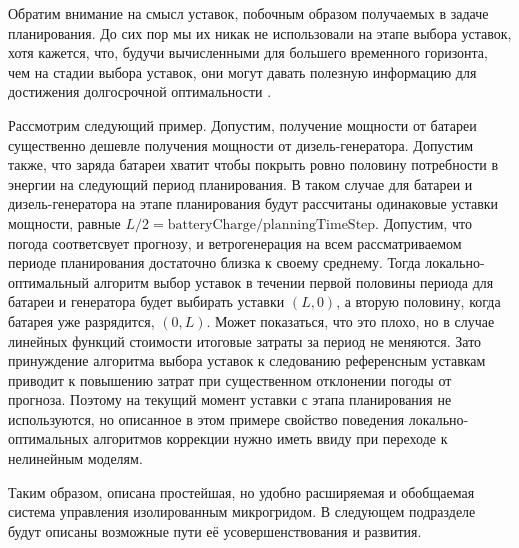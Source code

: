     
    \medskip
    
    Обратим внимание на смысл уставок, побочным образом получаемых в задаче планирования. 
    До сих пор мы их никак не использовали на этапе выбора уставок,  хотя кажется, что, будучи вычисленными для большего временного горизонта, чем на стадии выбора уставок, они могут давать полезную информацию для достижения долгосрочной оптимальности .
    
    Рассмотрим следующий пример.
    Допустим, получение мощности от батареи существенно дешевле получения мощности от дизель-генератора. Допустим также, что заряда батареи хватит чтобы покрыть ровно половину потребности в энергии на следующий период планирования.
    В таком случае для батареи и дизель-генератора на этапе планирования будут рассчитаны одинаковые уставки мощности, равные
    $L/2 = \text{batteryCharge} / \text{planningTimeStep}$.
    Допустим, что погода соответсвует прогнозу, и ветрогенерация на всем рассматриваемом периоде планирования достаточно близка к своему среднему.
    Тогда локально-оптимальный алгоритм выбор уставок в течении первой половины периода для батареи и генератора будет выбирать уставки $(L, 0)$, а вторую половину, когда батарея уже разрядится, $(0, L)$.
    Может показаться, что это плохо, но в случае линейных функций стоимости итоговые затраты за период не меняются. 
    Зато принуждение алгоритма выбора уставок к следованию референсным уставкам приводит к повышению затрат при существенном отклонении погоды от прогноза. 
    Поэтому на текущий момент уставки с этапа планирования не используются, но описанное в этом примере свойство поведения локально-оптимальных алгоритмов коррекции нужно иметь ввиду при переходе к нелинейным моделям.

    \medskip
    Таким образом, описана простейшая, но удобно расширяемая и обобщаемая система управления изолированным микрогридом.
    В следующем подразделе будут описаны возможные пути её усовершенствования и развития.
        
    

